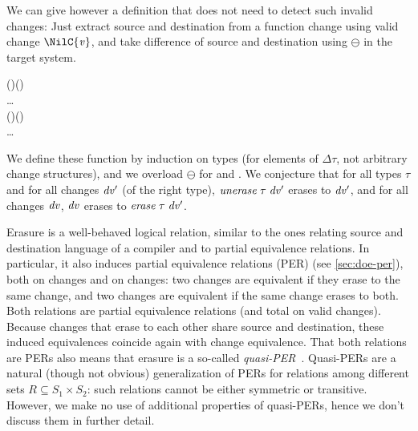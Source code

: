 We can give however a definition that does not need to detect such invalid
changes: Just extract source and destination from a function change using valid
change \ensuremath{\NilC{\Varid{v}}}, and take difference of source and destination using \ensuremath{\ominus }
in the target system.
\begin{hscode}\SaveRestoreHook
{}%
%
%
\>[3]{}\;(\sigma\to \tau)\;\mathrel{=}\;\mathrel{=}\lambda {}\to {}\;\;\;\;(\oplus {})\ominus {}\<[E]%
\\
\>[3]{}\;\text{\textunderscore}\;\mathrel{=}\ldots{}\<[E]%
\\[\blanklineskip]%
\>[3]{}\;(\sigma\to \tau)\;\mathrel{=}\;\mathrel{=}\lambda {}\to {}\;\;\;\;(\oplus {})\ominus {}\<[E]%
\\
\>[3]{}\;\text{\textunderscore}\;\mathrel{=}\ldots{}\<[E]%
\ColumnHook
\end{hscode}\resethooks
We define these function by induction on types (for elements of \ensuremath{\Delta \tau}, not
arbitrary change structures), and we overload \ensuremath{\ominus } for \ilcA{} and
\ilcB{}.
We conjecture that for all types \ensuremath{\tau} and for all \ilcB{} changes \ensuremath{\Varid{dv'}} (of the
right type),
\ensuremath{\Varid{unerase}\;\tau\;\Varid{dv'}} erases to \ensuremath{\Varid{dv'}}, and for all \ilcA{} changes \ensuremath{\Varid{dv}}, \ensuremath{\Varid{dv}} erases
to \ensuremath{\Varid{erase}\;\tau\;\Varid{dv'}}.

Erasure is a well-behaved logical relation, similar to the ones relating source
and destination language of a compiler and to partial equivalence relations. In
particular, it also induces partial equivalence relations (PER) (see
\cref{sec:doe-per}), both on \ilcA{} changes and on \ilcB{} changes: two \ilcA{}
changes are equivalent if they erase to the same \ilcB{} change, and two \ilcB{}
changes are equivalent if the same \ilcA{} change erases to both. Both relations
are partial equivalence relations (and total on valid changes). Because changes
that erase to each other share source and destination, these induced
equivalences coincide again with change equivalence. That both relations are
PERs also means that erasure is a so-called \emph{quasi-PER}~\citep{Krishnaswami2013internalizing}.
Quasi-PERs are a natural (though not obvious) generalization of PERs for
relations among different sets $R \subseteq S_1 \times S_2$: such relations cannot
be either symmetric or transitive. However, we make no use of additional
properties of quasi-PERs, hence we don't discuss them in further detail.


